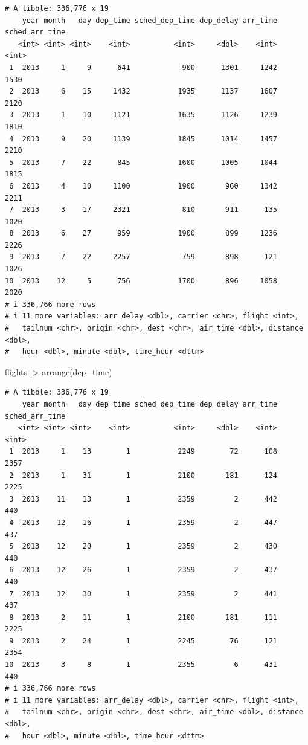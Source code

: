 \documentclass[
  letterpaper,
  DIV=11,
  numbers=noendperiod]{scrreprt}
\newenvironment{Shaded}{\begin{snugshade}}{\end{snugshade}}
\newcommand{\FunctionTok}[1]{\textcolor[rgb]{0.28,0.35,0.67}{#1}}
\newcommand{\NormalTok}[1]{\textcolor[rgb]{0.00,0.23,0.31}{#1}}
\newcommand{\SpecialCharTok}[1]{\textcolor[rgb]{0.37,0.37,0.37}{#1}}
\begin{document}
\begin{verbatim}
# A tibble: 336,776 x 19
    year month   day dep_time sched_dep_time dep_delay arr_time sched_arr_time
   <int> <int> <int>    <int>          <int>     <dbl>    <int>          <int>
 1  2013     1     9      641            900      1301     1242           1530
 2  2013     6    15     1432           1935      1137     1607           2120
 3  2013     1    10     1121           1635      1126     1239           1810
 4  2013     9    20     1139           1845      1014     1457           2210
 5  2013     7    22      845           1600      1005     1044           1815
 6  2013     4    10     1100           1900       960     1342           2211
 7  2013     3    17     2321            810       911      135           1020
 8  2013     6    27      959           1900       899     1236           2226
 9  2013     7    22     2257            759       898      121           1026
10  2013    12     5      756           1700       896     1058           2020
# i 336,766 more rows
# i 11 more variables: arr_delay <dbl>, carrier <chr>, flight <int>,
#   tailnum <chr>, origin <chr>, dest <chr>, air_time <dbl>, distance <dbl>,
#   hour <dbl>, minute <dbl>, time_hour <dttm>
\end{verbatim}

\begin{Shaded}
\begin{Highlighting}[]
\NormalTok{flights }\SpecialCharTok{|\textgreater{}}
  \FunctionTok{arrange}\NormalTok{(dep\_time)}
\end{Highlighting}
\end{Shaded}

\begin{verbatim}
# A tibble: 336,776 x 19
    year month   day dep_time sched_dep_time dep_delay arr_time sched_arr_time
   <int> <int> <int>    <int>          <int>     <dbl>    <int>          <int>
 1  2013     1    13        1           2249        72      108           2357
 2  2013     1    31        1           2100       181      124           2225
 3  2013    11    13        1           2359         2      442            440
 4  2013    12    16        1           2359         2      447            437
 5  2013    12    20        1           2359         2      430            440
 6  2013    12    26        1           2359         2      437            440
 7  2013    12    30        1           2359         2      441            437
 8  2013     2    11        1           2100       181      111           2225
 9  2013     2    24        1           2245        76      121           2354
10  2013     3     8        1           2355         6      431            440
# i 336,766 more rows
# i 11 more variables: arr_delay <dbl>, carrier <chr>, flight <int>,
#   tailnum <chr>, origin <chr>, dest <chr>, air_time <dbl>, distance <dbl>,
#   hour <dbl>, minute <dbl>, time_hour <dttm>
\end{verbatim}
\end{document}
